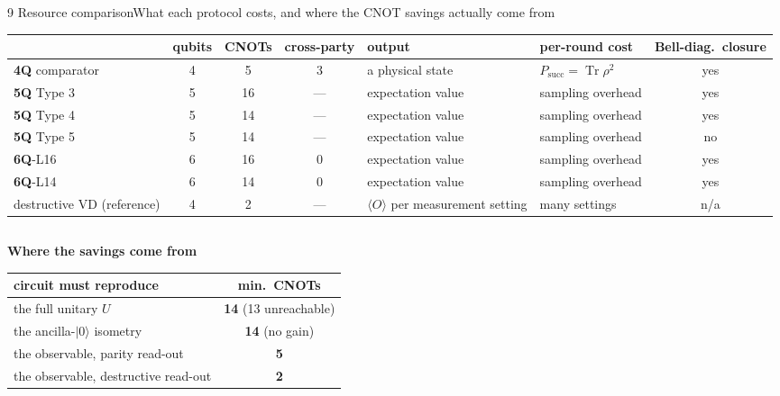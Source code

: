 \documentclass[aspectratio=169,10pt,t]{beamer}
\renewcommand{\arraystretch}{1.12}
\newcommand{\rowgap}{\addlinespace[1.2pt]}
\newcommand{\ket}[1]{\lvert #1 \rangle}
\newcommand{\avg}[1]{\langle #1 \rangle}
\newcommand{\Tr}{\operatorname{Tr}}
\newcommand{\acc}[1]{{\color{qitaccent}#1}}
\newcommand{\warn}[1]{{\color{qitwarn}#1}}
\newcommand{\unit}[1]{{\color{qitgray}#1}}
\begin{document}
\begin{frame}{9 \quad Resource comparison}{What each protocol costs, and where the CNOT savings actually come from}
  \vspace{0.8ex}
  \centering\scriptsize\renewcommand{\arraystretch}{1.05}%
  \setlength{\tabcolsep}{3.6pt}
  \begin{tabular}{@{}l c c c l l c@{}}
    \toprule
    & qubits & CNOTs & cross-party & output & per-round cost & Bell-diag.\ closure\\
    \midrule
    \textbf{4Q} comparator   & 4 & \acc{5}  & 3 & a physical state  & $P_{\mathrm{succ}}=\Tr\rho^{2}$ & yes\\\rowgap
    \textbf{5Q} Type 3       & 5 & 16 & --- & expectation value & sampling overhead & yes\\\rowgap
    \textbf{5Q} Type 4       & 5 & 14 & --- & expectation value & sampling overhead & yes\\\rowgap
    \textbf{5Q} Type 5       & 5 & 14 & --- & expectation value & sampling overhead & \warn{no}\\\rowgap
    \textbf{6Q}-L16          & 6 & 16 & \acc{0} & expectation value & sampling overhead & yes\\\rowgap
    \textbf{6Q}-L14          & 6 & 14 & \acc{0} & expectation value & sampling overhead & yes\\\rowgap
    destructive VD \unit{(reference)} & 4 & \acc{2} & --- & $\avg{O}$ per measurement setting & many settings & n/a\\
    \bottomrule
  \end{tabular}

  \vspace{2.4ex}
  \begin{columns}[T,onlytextwidth]
  \begin{column}{0.43\textwidth}\vspace{0pt}
    \scriptsize
    \textbf{Where the savings come from}
    \smallskip

    \begin{tabular}{@{}l c@{}}
      \toprule
      circuit must reproduce & min.\ CNOTs\\
      \midrule
      the full unitary $U$            & \textbf{14} \unit{(13 unreachable)}\\\rowgap
      the ancilla-$\ket{0}$ isometry  & \textbf{14} \unit{(no gain)}\\\rowgap
      the observable, parity read-out & \textbf{5}\\\rowgap
      the observable, destructive read-out & \textbf{2}\\
      \bottomrule
    \end{tabular}
    \smallskip


\end{column}
\end{columns}
\end{frame}
\end{document}

